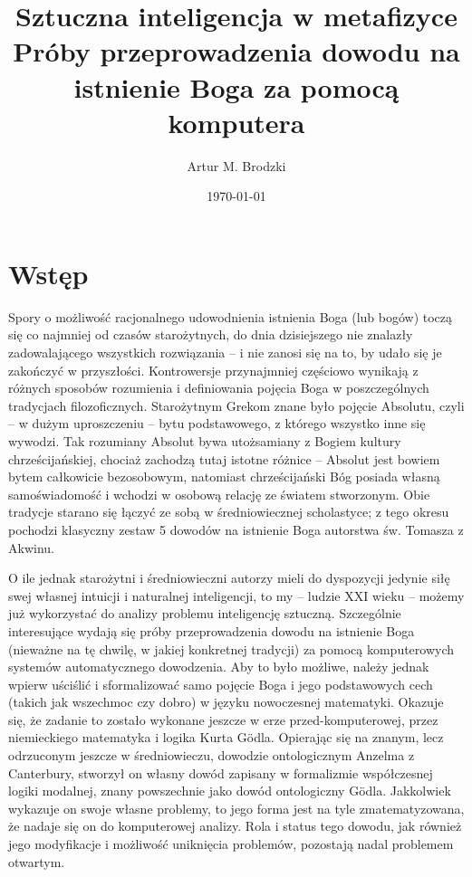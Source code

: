 \documentclass[
    showauthor=true,   %
    showsubject=false, %
    showdate=true,     %
    hyphenation=true   %
]{src/wut-report}
\begin{document}

\author{Artur M. Brodzki}
\subject{KPF 2018Z}
\title{Sztuczna inteligencja w metafizyce \\
	   \normalsize Próby przeprowadzenia dowodu na istnienie Boga za pomocą komputera}
\date{\today}
\maketitle

\leftheader{\theauthor}
\rightheader{\thesubject}


\section{Wstęp} \label{sec:intro}
Spory o możliwość racjonalnego udowodnienia istnienia Boga (lub bogów) toczą się co najmniej od czasów starożytnych, do dnia dzisiejszego nie znalazły zadowalającego wszystkich rozwiązania -- i nie zanosi się na to, by udało się je zakończyć w przyszłości. Kontrowersje przynajmniej częściowo wynikają z różnych sposobów rozumienia i definiowania pojęcia Boga w poszczególnych tradycjach filozoficznych. Starożytnym Grekom znane było pojęcie Absolutu, czyli -- w dużym uproszczeniu -- bytu podstawowego, z którego wszystko inne się wywodzi. Tak rozumiany Absolut bywa utożsamiany z Bogiem kultury chrześcijańskiej, chociaż zachodzą tutaj istotne różnice -- Absolut jest bowiem bytem całkowicie bezosobowym, natomiast chrześcijański Bóg posiada własną samoświadomość i wchodzi w osobową relację ze światem stworzonym. Obie tradycje starano się łączyć ze sobą w średniowiecznej scholastyce; z tego okresu pochodzi klasyczny zestaw 5 dowodów na istnienie Boga autorstwa św. Tomasza z Akwinu.

O ile jednak starożytni i średniowieczni autorzy mieli do dyspozycji jedynie siłę swej własnej intuicji i naturalnej inteligencji, to my -- ludzie XXI wieku -- możemy już wykorzystać do analizy problemu inteligencję sztuczną. Szczególnie interesujące wydają się próby przeprowadzenia dowodu na istnienie Boga (nieważne na tę chwilę, w jakiej konkretnej tradycji) za pomocą komputerowych systemów automatycznego dowodzenia. Aby to było możliwe, należy jednak wpierw uściślić i sformalizować samo pojęcie Boga i jego podstawowych cech (takich jak wszechmoc czy dobro) w języku nowoczesnej matematyki. Okazuje się, że zadanie to zostało wykonane jeszcze w erze przed-komputerowej, przez niemieckiego matematyka i logika Kurta G\"odla. Opierając się na znanym, lecz odrzuconym jeszcze w średniowieczu, dowodzie ontologicznym Anzelma z Canterbury, stworzył on własny dowód zapisany w formalizmie współczesnej logiki modalnej, znany powszechnie jako dowód ontologiczny G\"odla. Jakkolwiek wykazuje on swoje własne problemy, to jego forma jest na tyle zmatematyzowana, że nadaje się on do komputerowej analizy. Rola i status tego dowodu, jak również jego modyfikacje i możliwość uniknięcia problemów, pozostają nadal problemem otwartym.
\end{document}
